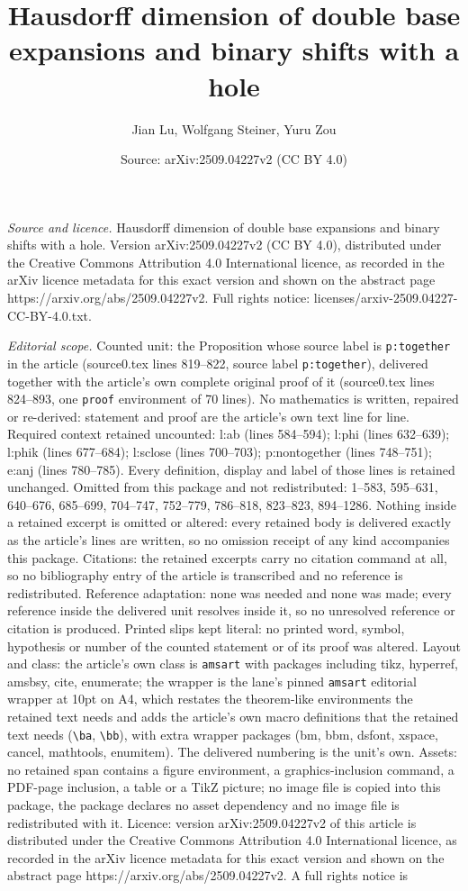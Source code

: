 \documentclass[10pt,a4paper]{amsart}
\title[Hausdorff dimension of double base expansions and binary shi]{Hausdorff dimension of double base expansions and binary shifts with a hole}
\author{Jian Lu, Wolfgang Steiner, Yuru Zou}
\date{Source: arXiv:2509.04227v2 (CC BY 4.0)}
\begin{document}
\maketitle

\noindent\emph{Source and licence.} Hausdorff dimension of double base expansions and binary shifts with a hole. Version arXiv:2509.04227v2 (CC BY 4.0), distributed under the Creative Commons Attribution 4.0 International licence, as recorded in the arXiv licence metadata for this exact version and shown on the abstract page https://arxiv.org/abs/2509.04227v2. Full rights notice: licenses/arxiv-2509.04227-CC-BY-4.0.txt.\par\smallskip

\noindent\textit{Editorial scope.} Counted unit: the Proposition whose source label is \texttt{p:together} in the article (source0.tex lines 819--822, source label \texttt{p:together}), delivered together with the article's own complete original proof of it (source0.tex lines 824--893, one \texttt{proof} environment of 70 lines). No mathematics is written, repaired or re-derived: statement and proof are the article's own text line for line. Required context retained uncounted: l:ab (lines 584--594); l:phi (lines 632--639); l:phik (lines 677--684); l:sclose (lines 700--703); p:nontogether (lines 748--751); e:anj (lines 780--785). Every definition, display and label of those lines is retained unchanged. Omitted from this package and not redistributed: 1--583, 595--631, 640--676, 685--699, 704--747, 752--779, 786--818, 823--823, 894--1286. Nothing inside a retained excerpt is omitted or altered: every retained body is delivered exactly as the article's lines are written, so no omission receipt of any kind accompanies this package. Citations: the retained excerpts carry no citation command at all, so no bibliography entry of the article is transcribed and no reference is redistributed. Reference adaptation: none was needed and none was made; every reference inside the delivered unit resolves inside it, so no unresolved reference or citation is produced. Printed slips kept literal: no printed word, symbol, hypothesis or number of the counted statement or of its proof was altered. Layout and class: the article's own class is \texttt{amsart} with packages including tikz, hyperref, amsbsy, cite, enumerate; the wrapper is the lane's pinned \texttt{amsart} editorial wrapper at 10pt on A4, which restates the theorem-like environments the retained text needs and adds the article's own macro definitions that the retained text needs (\texttt{\textbackslash ba}, \texttt{\textbackslash bb}), with extra wrapper packages (bm, bbm, dsfont, xspace, cancel, mathtools, enumitem). The delivered numbering is the unit's own. Assets: no retained span contains a figure environment, a graphics-inclusion command, a PDF-page inclusion, a table or a TikZ picture; no image file is copied into this package, the package declares no asset dependency and no image file is redistributed with it. Licence: version arXiv:2509.04227v2 of this article is distributed under the Creative Commons Attribution 4.0 International licence, as recorded in the arXiv licence metadata for this exact version and shown on the abstract page https://arxiv.org/abs/2509.04227v2. A full rights notice is 
\end{document}
